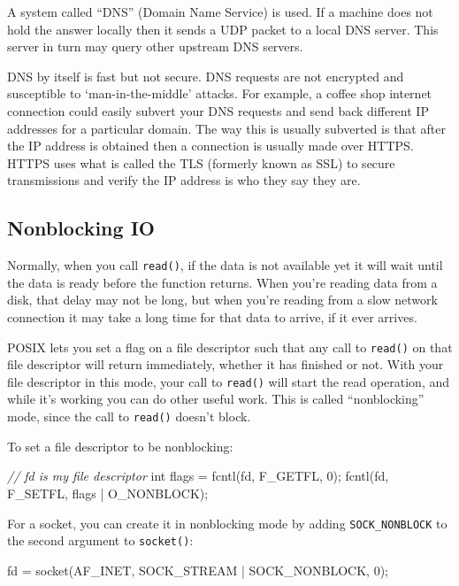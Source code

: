 \documentclass[]{article}
\newenvironment{Shaded}{}{}
\newcommand{\DataTypeTok}[1]{\textcolor[rgb]{0.56,0.13,0.00}{{#1}}}
\newcommand{\DecValTok}[1]{\textcolor[rgb]{0.25,0.63,0.44}{{#1}}}
\newcommand{\CommentTok}[1]{\textcolor[rgb]{0.38,0.63,0.69}{\textit{{#1}}}}
\newcommand{\NormalTok}[1]{{#1}}
\begin{document}
A system called ``DNS'' (Domain Name Service) is used. If a machine does
not hold the answer locally then it sends a UDP packet to a local DNS
server. This server in turn may query other upstream DNS servers.

DNS by itself is fast but not secure. DNS requests are not encrypted and
susceptible to `man-in-the-middle' attacks. For example, a coffee shop
internet connection could easily subvert your DNS requests and send back
different IP addresses for a particular domain. The way this is usually
subverted is that after the IP address is obtained then a connection is
usually made over HTTPS. HTTPS uses what is called the TLS (formerly
known as SSL) to secure transmissions and verify the IP address is who
they say they are.

\subsection{Nonblocking IO}\label{nonblocking-io}

Normally, when you call \texttt{read()}, if the data is not available
yet it will wait until the data is ready before the function returns.
When you're reading data from a disk, that delay may not be long, but
when you're reading from a slow network connection it may take a long
time for that data to arrive, if it ever arrives.

POSIX lets you set a flag on a file descriptor such that any call to
\texttt{read()} on that file descriptor will return immediately, whether
it has finished or not. With your file descriptor in this mode, your
call to \texttt{read()} will start the read operation, and while it's
working you can do other useful work. This is called ``nonblocking''
mode, since the call to \texttt{read()} doesn't block.

To set a file descriptor to be nonblocking:

\begin{Shaded}
\begin{Highlighting}[]
\CommentTok{// fd is my file descriptor}
\DataTypeTok{int} \NormalTok{flags = fcntl(fd, F_GETFL, }\DecValTok{0}\NormalTok{);}
\NormalTok{fcntl(fd, F_SETFL, flags | O_NONBLOCK);}
\end{Highlighting}
\end{Shaded}

For a socket, you can create it in nonblocking mode by adding
\texttt{SOCK\_NONBLOCK} to the second argument to \texttt{socket()}:

\begin{Shaded}
\begin{Highlighting}[]
\NormalTok{fd = socket(AF_INET, SOCK_STREAM | SOCK_NONBLOCK, }\DecValTok{0}\NormalTok{);}
\end{Highlighting}
\end{Shaded}
\end{document}
